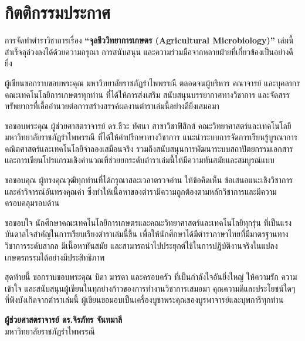 \chapter*{กิตติกรรมประกาศ}

การจัดทำตำราวิชาการเรื่อง \textbf{“จุลชีววิทยาการเกษตร (Agricultural Microbiology)”} เล่มนี้ สำเร็จลุล่วงลงได้ด้วยความกรุณา การสนับสนุน และความร่วมมือจากหลายฝ่ายที่เกี่ยวข้องเป็นอย่างดียิ่ง

ผู้เขียนขอกราบขอบพระคุณ มหาวิทยาลัยราชภัฏรำไพพรรณี ตลอดจนผู้บริหาร คณาจารย์ และบุคลากรคณะเทคโนโลยีการเกษตรทุกท่าน ที่ได้ให้การส่งเสริม สนับสนุนบรรยากาศทางวิชาการ และจัดสรรทรัพยากรที่เอื้ออำนวยต่อการสร้างสรรค์ผลงานตำราเล่มนี้อย่างดียิ่งเสมอมา

ขอขอบพระคุณ ผู้ช่วยศาสตราจารย์ ดร.ชีวะ ทัศนา สาขาวิชาฟิสิกส์ คณะวิทยาศาสตร์และเทคโนโลยี มหาวิทยาลัยราชภัฏรำไพพรรณี ที่ได้ให้คำปรึกษาทางวิชาการ แนะนำระบบการจัดการเรียนรู้บูรณาการคณิตศาสตร์และเทคโนโลยีจำลองเสมือนจริง รวมถึงสนับสนุนการพัฒนาระบบสถาปัตยกรรมเอกสารและการเขียนโปรแกรมเชิงคำนวณที่ช่วยยกระดับตำราเล่มนี้ให้มีความทันสมัยและสมบูรณ์แบบ

ขอขอบคุณ ผู้ทรงคุณวุฒิทุกท่านที่ได้กรุณาสละเวลาตรวจอ่าน ให้ข้อคิดเห็น ข้อเสนอแนะเชิงวิชาการ และคำวิจารณ์อันทรงคุณค่า ซึ่งทำให้เนื้อหาของตำรามีความถูกต้องตามหลักวิชาการและมีความครอบคลุมรอบด้าน

ขอขอบใจ นักศึกษาคณะเทคโนโลยีการเกษตรและคณะวิทยาศาสตร์และเทคโนโลยีทุกรุ่น ที่เป็นแรงบันดาลใจสำคัญในการเรียบเรียงตำราเล่มนี้ขึ้น เพื่อให้นักศึกษาได้มีตำราภาษาไทยที่มีมาตรฐานทางวิชาการระดับสากล มีเนื้อหาทันสมัย และสามารถนำไปประยุกต์ใช้ในการปฏิบัติงานจริงในแปลงเกษตรกรรมได้อย่างมีประสิทธิภาพ

สุดท้ายนี้ ขอกราบขอบพระคุณ บิดา มารดา และครอบครัว ที่เป็นกำลังใจอันยิ่งใหญ่ ให้ความรัก ความเข้าใจ และสนับสนุนผู้เขียนในทุกย่างก้าวของการทำงานวิชาการเสมอมา คุณความดีและประโยชน์ใดๆ ที่พึงบังเกิดจากตำราเล่มนี้ ผู้เขียนขอมอบเป็นเครื่องบูชาพระคุณของบูรพาจารย์และบุพการีทุกท่าน

\vspace{1.5cm}
\begin{flushright}
    \textbf{ผู้ช่วยศาสตราจารย์ ดร.จิรภัทร จันทมาลี}\\
    มหาวิทยาลัยราชภัฏรำไพพรรณี
\end{flushright}
\clearpage
